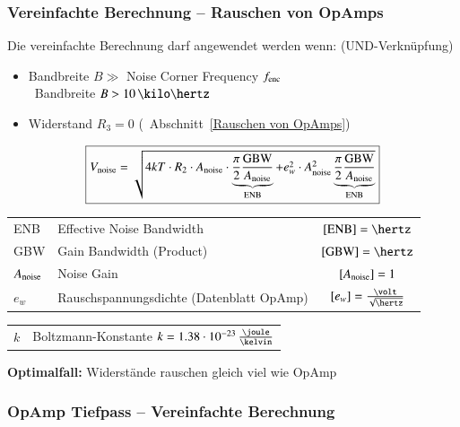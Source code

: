 \subsubsection{Vereinfachte Berechnung -- Rauschen von OpAmps}

Die vereinfachte Berechnung darf angewendet werden wenn: (UND-Verknüpfung)
\begin{itemize}
    \item Bandbreite $B \gg$ Noise Corner Frequency $f_{\rm enc}$ \\
        \textrightarrow\ Bandbreite $B > 10 \, \kilo \hertz$
    \item Widerstand $R_3 = 0$ (\textrightarrow\ Abschnitt~\ref{Rauschen von OpAmps})
\end{itemize}

$$ \boxed{ V_{\rm noise} = \sqrt{4 k T \cdot R_2 \cdot A_{\rm noise} \cdot \underbrace{ \frac{\pi}{2} \frac{\text{GBW}}{A_{\rm noise}} }_{\text{ENB}}
+ e_w^2 \cdot A_{\rm noise}^2 \underbrace{ \frac{\pi}{2} \frac{\text{GBW}}{A_{\rm noise}} }_{\text{ENB}} }} $$

\begin{tabular}{llc}
    ENB             & Effective Noise Bandwidth                 & $[\text{ENB}] = \hertz$ \\
    GBW             & Gain Bandwidth (Product)                  & $[\text{GBW}] = \hertz$ \\
    $A_{\rm noise}$ & Noise Gain                                & $[A_{\rm noise}] = 1$ \\
    $e_w$           & Rauschspannungsdichte (Datenblatt OpAmp)  & $[e_w] = \frac{\volt}{\sqrt{\hertz}}$ \\
\end{tabular}

\begin{tabular}{ll}
    $k$             & Boltzmann-Konstante $k = 1.38 \cdot 10^{-23} \, \frac{\joule}{\kelvin}$ \\
\end{tabular}
    
\textbf{Optimalfall:} Widerstände rauschen gleich viel wie OpAmp


\subsubsection{OpAmp Tiefpass -- Vereinfachte Berechnung}

